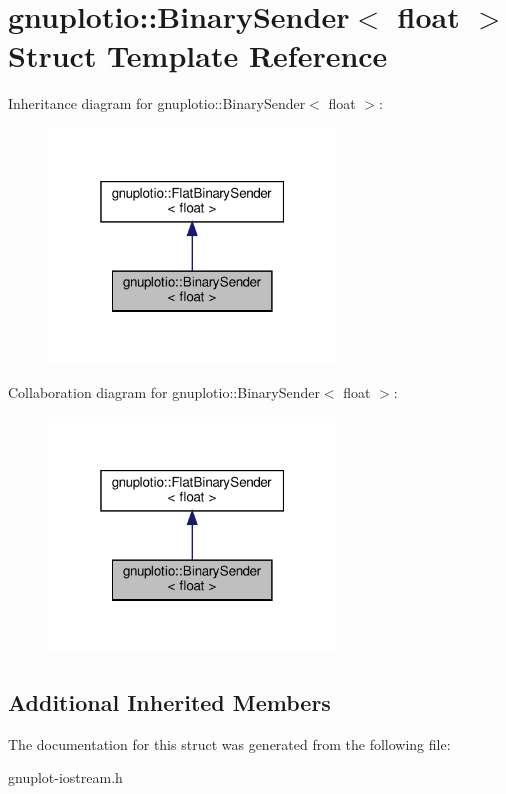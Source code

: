 \hypertarget{structgnuplotio_1_1BinarySender_3_01float_01_4}{}\section{gnuplotio\+:\+:Binary\+Sender$<$ float $>$ Struct Template Reference}
\label{structgnuplotio_1_1BinarySender_3_01float_01_4}


Inheritance diagram for gnuplotio\+:\+:Binary\+Sender$<$ float $>$\+:
\nopagebreak
\begin{figure}[H]
\begin{center}
\leavevmode
\includegraphics[width=217pt]{structgnuplotio_1_1BinarySender_3_01float_01_4__inherit__graph}
\end{center}
\end{figure}


Collaboration diagram for gnuplotio\+:\+:Binary\+Sender$<$ float $>$\+:
\nopagebreak
\begin{figure}[H]
\begin{center}
\leavevmode
\includegraphics[width=217pt]{structgnuplotio_1_1BinarySender_3_01float_01_4__coll__graph}
\end{center}
\end{figure}
\subsection*{Additional Inherited Members}


The documentation for this struct was generated from the following file\+:\begin{DoxyCompactItemize}
\item 
gnuplot-\/iostream.\+h\end{DoxyCompactItemize}
